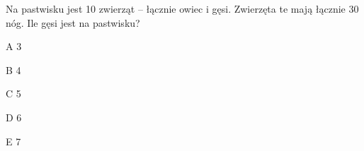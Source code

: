\begin{tresc}
Na pastwisku jest 10 zwierząt – łącznie owiec i gęsi. Zwierzęta te mają łącznie 30 nóg. Ile gęsi jest na pastwisku?
\end{tresc}
\begin{wariant}{A} 3 \end{wariant}
\begin{wariant}{B} 4 \end{wariant}
\begin{wariant}{C} 5 \end{wariant}
\begin{wariant}{D} 6 \end{wariant}
\begin{wariant}{E} 7 \end{wariant}
